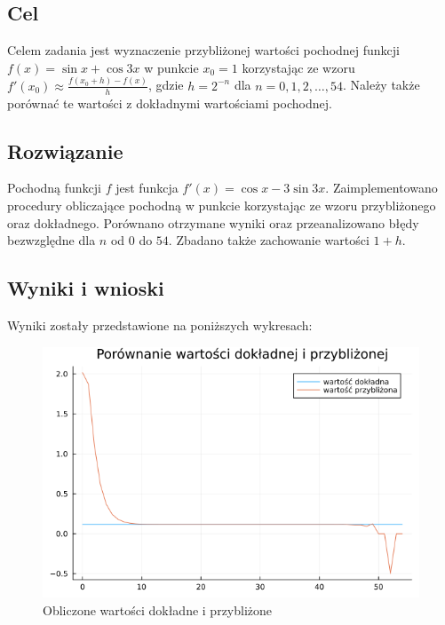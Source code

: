 \documentclass{article}
\begin{document}
\subsection{Cel}
Celem zadania jest wyznaczenie przybliżonej wartości pochodnej funkcji $f(x) = \sin{x} + \cos{3x}$ w punkcie $x_0 = 1$ korzystając ze wzoru $f'(x_0) \approx \frac{f(x_0 + h) - f(x)}{h}$, gdzie $h = 2^{-n}$ dla $n = {0, 1, 2, \dots, 54}$. Należy także porównać te wartości z dokładnymi wartościami pochodnej.

\subsection{Rozwiązanie}
Pochodną funkcji $f$ jest funkcja $f'(x) = \cos{x} - 3\sin{3x}$.
\newline
Zaimplementowano procedury obliczające pochodną w punkcie korzystając ze wzoru przybliżonego oraz dokładnego. Porównano otrzymane wyniki oraz przeanalizowano błędy bezwzględne dla $n$ od $0$ do $54$. Zbadano także zachowanie wartości $1 + h$.

\subsection{Wyniki i wnioski}
Wyniki zostały przedstawione na poniższych wykresach:

\begin{figure}[h!]
    \centering
    \includegraphics[scale=0.35]{plots/zad7-plot1.png}
    \caption{Obliczone wartości dokładne i przybliżone}
\end{figure}
\end{document}
